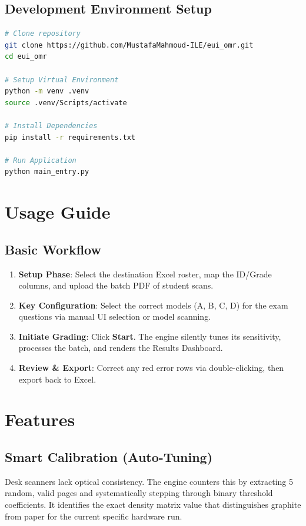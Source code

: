 \documentclass[12pt,a4paper]{article}
\begin{document}
\subsection{Development Environment Setup}
\begin{lstlisting}[language=bash]
# Clone repository
git clone https://github.com/MustafaMahmoud-ILE/eui_omr.git
cd eui_omr

# Setup Virtual Environment
python -m venv .venv
source .venv/Scripts/activate

# Install Dependencies
pip install -r requirements.txt

# Run Application
python main_entry.py
\end{lstlisting}

\section{Usage Guide}

\subsection{Basic Workflow}
\begin{enumerate}
    \item \textbf{Setup Phase}: Select the destination Excel roster, map the ID/Grade columns, and upload the batch PDF of student scans.
    \item \textbf{Key Configuration}: Select the correct models (A, B, C, D) for the exam questions via manual UI selection or model scanning.
    \item \textbf{Initiate Grading}: Click \textbf{Start}. The engine silently tunes its sensitivity, processes the batch, and renders the Results Dashboard.
    \item \textbf{Review \& Export}: Correct any red error rows via double-clicking, then export back to Excel.
\end{enumerate}

\section{Features}

\subsection{Smart Calibration (Auto-Tuning)}
Desk scanners lack optical consistency. The engine counters this by extracting 5 random, valid pages and systematically stepping through binary threshold coefficients. It identifies the exact density matrix value that distinguishes graphite from paper for the current specific hardware run.
\end{document}
